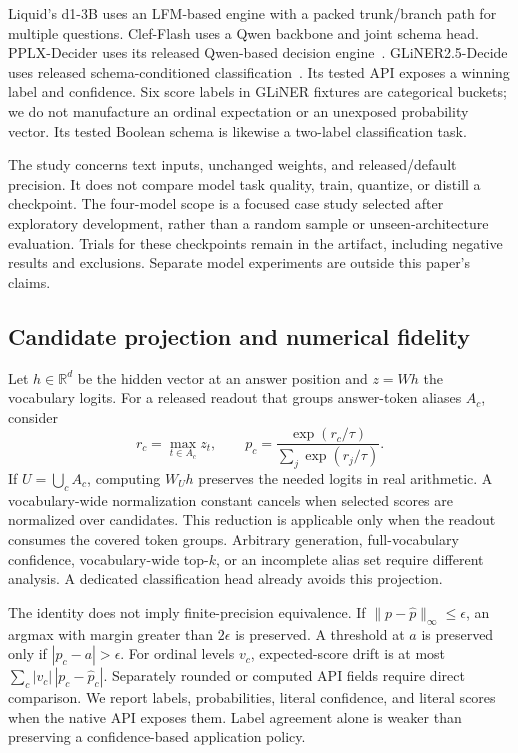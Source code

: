 \documentclass[10pt,twocolumn]{article}
\begin{document}
Liquid's d1-3B uses an LFM-based engine with a packed trunk/branch path for multiple questions. Clef-Flash uses a Qwen backbone and joint schema head. PPLX-Decider uses its released Qwen-based decision engine~\citep{liquid,clef,decider}. GLiNER2.5-Decide uses released schema-conditioned classification~\citep{glinerdecide,gliner2}. Its tested API exposes a winning label and confidence. Six score labels in GLiNER fixtures are categorical buckets; we do not manufacture an ordinal expectation or an unexposed probability vector. Its tested Boolean schema is likewise a two-label classification task.

The study concerns text inputs, unchanged weights, and released/default precision. It does not compare model task quality, train, quantize, or distill a checkpoint. The four-model scope is a focused case study selected after exploratory development, rather than a random sample or unseen-architecture evaluation. Trials for these checkpoints remain in the artifact, including negative results and exclusions. Separate model experiments are outside this paper's claims.

\subsection{Candidate projection and numerical fidelity}
Let $h\in\mathbb{R}^{d}$ be the hidden vector at an answer position and $z=Wh$ the vocabulary logits. For a released readout that groups answer-token aliases $A_c$, consider
\begin{equation}
 r_c=\max_{t\in A_c}z_t,\qquad
 p_c=\frac{\exp(r_c/\tau)}{\sum_j\exp(r_j/\tau)}.
\end{equation}
If $U=\bigcup_c A_c$, computing $W_Uh$ preserves the needed logits in real arithmetic. A vocabulary-wide normalization constant cancels when selected scores are normalized over candidates. This reduction is applicable only when the readout consumes the covered token groups. Arbitrary generation, full-vocabulary confidence, vocabulary-wide top-$k$, or an incomplete alias set require different analysis. A dedicated classification head already avoids this projection.

The identity does not imply finite-precision equivalence. If $\|p-\hat p\|_\infty\leq\epsilon$, an argmax with margin greater than $2\epsilon$ is preserved. A threshold at $a$ is preserved only if $|p_c-a|>\epsilon$. For ordinal levels $v_c$, expected-score drift is at most $\sum_c |v_c|\,|p_c-\hat p_c|$. Separately rounded or computed API fields require direct comparison. We report labels, probabilities, literal confidence, and literal scores when the native API exposes them. Label agreement alone is weaker than preserving a confidence-based application policy.
\end{document}
